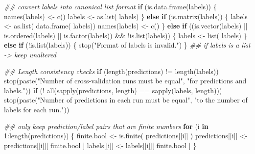 \documentclass[
  letterpaper,
  DIV=11,
  numbers=noendperiod]{scrartcl}
\newenvironment{Shaded}{\begin{snugshade}}{\end{snugshade}}
\newcommand{\ControlFlowTok}[1]{\textcolor[rgb]{0.00,0.23,0.31}{\textbf{#1}}}
\newcommand{\DecValTok}[1]{\textcolor[rgb]{0.68,0.00,0.00}{#1}}
\newcommand{\DocumentationTok}[1]{\textcolor[rgb]{0.37,0.37,0.37}{\textit{#1}}}
\newcommand{\FunctionTok}[1]{\textcolor[rgb]{0.28,0.35,0.67}{#1}}
\newcommand{\NormalTok}[1]{\textcolor[rgb]{0.00,0.23,0.31}{#1}}
\newcommand{\OtherTok}[1]{\textcolor[rgb]{0.00,0.23,0.31}{#1}}
\newcommand{\SpecialCharTok}[1]{\textcolor[rgb]{0.37,0.37,0.37}{#1}}
\newcommand{\StringTok}[1]{\textcolor[rgb]{0.13,0.47,0.30}{#1}}
\begin{document}
\begin{Shaded}
\begin{Highlighting}[]
    \DocumentationTok{\#\# convert labels into canonical list format}
    \ControlFlowTok{if}\NormalTok{ (}\FunctionTok{is.data.frame}\NormalTok{(labels)) \{}
        \FunctionTok{names}\NormalTok{(labels) }\OtherTok{\textless{}{-}} \FunctionTok{c}\NormalTok{()}
\NormalTok{        labels }\OtherTok{\textless{}{-}} \FunctionTok{as.list}\NormalTok{( labels)}
\NormalTok{    \} }\ControlFlowTok{else} \ControlFlowTok{if}\NormalTok{ (}\FunctionTok{is.matrix}\NormalTok{(labels)) \{}
\NormalTok{        labels }\OtherTok{\textless{}{-}} \FunctionTok{as.list}\NormalTok{( }\FunctionTok{data.frame}\NormalTok{( labels))}
        \FunctionTok{names}\NormalTok{(labels) }\OtherTok{\textless{}{-}} \FunctionTok{c}\NormalTok{()}
\NormalTok{    \} }\ControlFlowTok{else} \ControlFlowTok{if}\NormalTok{ ((}\FunctionTok{is.vector}\NormalTok{(labels) }\SpecialCharTok{||}
                \FunctionTok{is.ordered}\NormalTok{(labels) }\SpecialCharTok{||}
                \FunctionTok{is.factor}\NormalTok{(labels)) }\SpecialCharTok{\&\&}
               \SpecialCharTok{!}\FunctionTok{is.list}\NormalTok{(labels)) \{}
\NormalTok{        labels }\OtherTok{\textless{}{-}} \FunctionTok{list}\NormalTok{( labels)}
\NormalTok{    \} }\ControlFlowTok{else} \ControlFlowTok{if}\NormalTok{ (}\SpecialCharTok{!}\FunctionTok{is.list}\NormalTok{(labels)) \{}
        \FunctionTok{stop}\NormalTok{(}\StringTok{"Format of labels is invalid."}\NormalTok{)}
\NormalTok{    \}}
    \DocumentationTok{\#\# if labels is a list {-}\textgreater{} keep unaltered}

    \DocumentationTok{\#\# Length consistency checks}
    \ControlFlowTok{if}\NormalTok{ (}\FunctionTok{length}\NormalTok{(predictions) }\SpecialCharTok{!=} \FunctionTok{length}\NormalTok{(labels))}
      \FunctionTok{stop}\NormalTok{(}\FunctionTok{paste}\NormalTok{(}\StringTok{"Number of cross{-}validation runs must be equal"}\NormalTok{,}
                 \StringTok{"for predictions and labels."}\NormalTok{))}
    \ControlFlowTok{if}\NormalTok{ (}\SpecialCharTok{!} \FunctionTok{all}\NormalTok{(}\FunctionTok{sapply}\NormalTok{(predictions, length) }\SpecialCharTok{==} \FunctionTok{sapply}\NormalTok{(labels, length)))}
      \FunctionTok{stop}\NormalTok{(}\FunctionTok{paste}\NormalTok{(}\StringTok{"Number of predictions in each run must be equal"}\NormalTok{,}
                 \StringTok{"to the number of labels for each run."}\NormalTok{))}
    
    \DocumentationTok{\#\# only keep prediction/label pairs that are finite numbers}
    \ControlFlowTok{for}\NormalTok{ (i }\ControlFlowTok{in} \DecValTok{1}\SpecialCharTok{:}\FunctionTok{length}\NormalTok{(predictions)) \{}
\NormalTok{        finite.bool }\OtherTok{\textless{}{-}} \FunctionTok{is.finite}\NormalTok{( predictions[[i]] )}
\NormalTok{        predictions[[i]] }\OtherTok{\textless{}{-}}\NormalTok{ predictions[[i]][ finite.bool ]}
\NormalTok{        labels[[i]] }\OtherTok{\textless{}{-}}\NormalTok{ labels[[i]][ finite.bool ]}
\NormalTok{    \}}


\end{Highlighting}
\end{Shaded}
\end{document}
